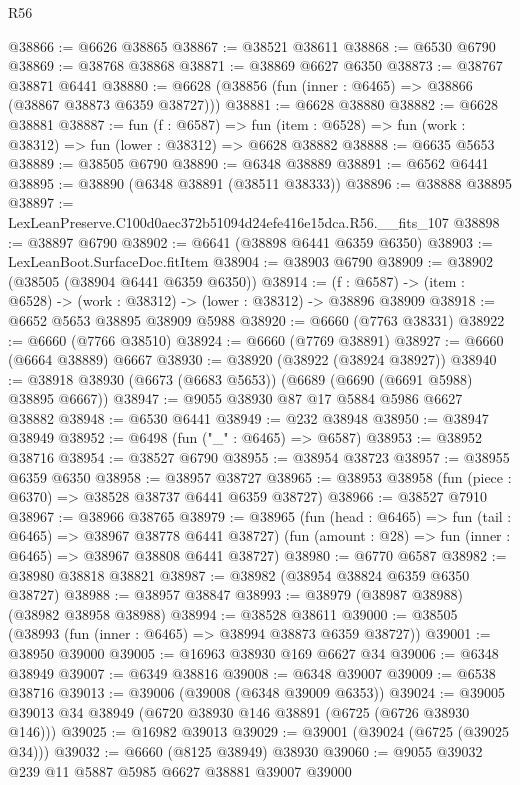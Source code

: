 \begin{lexlean}{R56}
\begin{coremodule}
@38866 := @6626 @38865
@38867 := @38521 @38611
@38868 := @6530 @6790
@38869 := @38768 @38868
@38871 := @38869 @6627 @6350
@38873 := @38767 @38871 @6441
@38880 := @6628 (@38856 (fun (inner : @6465) => @38866 (@38867 @38873 @6359 @38727)))
@38881 := @6628 @38880
@38882 := @6628 @38881
@38887 := fun (f : @6587) =>
  fun (item : @6528) => fun (work : @38312) => fun (lower : @38312) => @6628 @38882
@38888 := @6635 @5653
@38889 := @38505 @6790
@38890 := @6348 @38889
@38891 := @6562 @6441
@38895 := @38890 (@6348 @38891 (@38511 @38333))
@38896 := @38888 @38895
@38897 := LexLeanPreserve.C100d0aec372b51094d24efe416e15dca.R56.__fits_107
@38898 := @38897 @6790
@38902 := @6641 (@38898 @6441 @6359 @6350)
@38903 := LexLeanBoot.SurfaceDoc.fitItem
@38904 := @38903 @6790
@38909 := @38902 (@38505 (@38904 @6441 @6359 @6350))
@38914 := (f : @6587) -> (item : @6528) -> (work : @38312) -> (lower : @38312) -> @38896 @38909
@38918 := @6652 @5653 @38895 @38909 @5988
@38920 := @6660 (@7763 @38331)
@38922 := @6660 (@7766 @38510)
@38924 := @6660 (@7769 @38891)
@38927 := @6660 (@6664 @38889) @6667
@38930 := @38920 (@38922 (@38924 @38927))
@38940 := @38918 @38930 (@6673 (@6683 @5653)) (@6689 (@6690 (@6691 @5988) @38895 @6667))
@38947 := @9055 @38930 @87 @17 @5884 @5986 @6627 @38882
@38948 := @6530 @6441
@38949 := @232 @38948
@38950 := @38947 @38949
@38952 := @6498 (fun ("_" : @6465) => @6587)
@38953 := @38952 @38716
@38954 := @38527 @6790
@38955 := @38954 @38723
@38957 := @38955 @6359 @6350
@38958 := @38957 @38727
@38965 := @38953 @38958 (fun (piece : @6370) => @38528 @38737 @6441 @6359 @38727)
@38966 := @38527 @7910
@38967 := @38966 @38765
@38979 := @38965
    (fun (head : @6465) => fun (tail : @6465) => @38967 @38778 @6441 @38727)
    (fun (amount : @28) => fun (inner : @6465) => @38967 @38808 @6441 @38727)
@38980 := @6770 @6587
@38982 := @38980 @38818 @38821
@38987 := @38982 (@38954 @38824 @6359 @6350 @38727)
@38988 := @38957 @38847
@38993 := @38979 (@38987 @38988) (@38982 @38958 @38988)
@38994 := @38528 @38611
@39000 := @38505 (@38993 (fun (inner : @6465) => @38994 @38873 @6359 @38727))
@39001 := @38950 @39000
@39005 := @16963 @38930 @169 @6627 @34
@39006 := @6348 @38949
@39007 := @6349 @38816
@39008 := @6348 @39007
@39009 := @6538 @38716
@39013 := @39006 (@39008 (@6348 @39009 @6353))
@39024 := @39005 @39013 @34 @38949 (@6720 @38930 @146 @38891 (@6725 (@6726 @38930 @146)))
@39025 := @16982 @39013
@39029 := @39001 (@39024 (@6725 (@39025 @34)))
@39032 := @6660 (@8125 @38949) @38930
@39060 := @9055
    @39032
    @239
    @11
    @5887
    @5985
    @6627
    @38881
    @39007
    @39000

\end{coremodule}
\end{lexlean}
